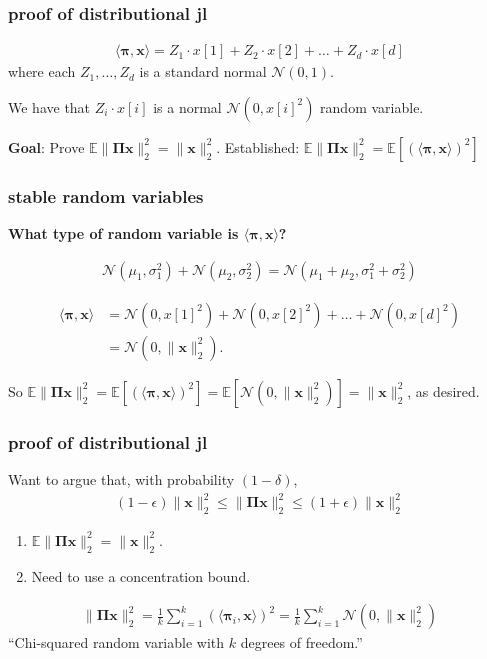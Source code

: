 \documentclass[compress]{beamer}
\newcommand{\bs}[1]{\boldsymbol{#1}}
\newcommand{\bv}[1]{\mathbf{#1}}
\newcommand{\E}{\mathbb{E}}
\begin{document}
\begin{frame}
	\frametitle{proof of distributional jl}	
	\begin{align*}
		\langle\bs{\pi},\bv{x}\rangle = Z_1\cdot{x}[1] + Z_2\cdot{x}[2]  +  \ldots + Z_d\cdot{x}[d]
	\end{align*}
	where each $Z_1, \ldots, Z_d$ is a standard normal $\mathcal{N}(0,1)$. 
	
	We have that $Z_i \cdot{x}[i]$ is a normal $\mathcal{N}(0,{x}[i]^2)$ random variable.
	
	\vspace{5em}
	\begin{block}{\vspace*{-3ex}}
		\small \textbf{Goal}: Prove $\E \|\bs{\Pi} \bv{x} \|_2^2 = \|\bv{x}\|_2^2$. Established: $\E \|\bs{\Pi} \bv{x} \|_2^2 = \E\left[\left(\langle\bs{\pi},\bv{x}\rangle\right)^2 \right]$
	\end{block}
\end{frame}

\begin{frame}[t]
	\frametitle{stable random variables}
	\textbf{What type of random variable is $\langle\bs{\pi},\bv{x}\rangle$?}
	\begin{fact}
		\begin{align*}
			\mathcal{N}(\mu_1, \sigma_1^2) + \mathcal{N}(\mu_2, \sigma_2^2) =  \mathcal{N}(\mu_1 + \mu_2, \sigma_1^2 + \sigma_2^2)
		\end{align*}
	\end{fact}
	\begin{align*}
		\langle\bs{\pi},\bv{x}\rangle &= \mathcal{N}(0,{x}[1]^2) + \mathcal{N}(0,{x}[2]^2) + \ldots + \mathcal{N}(0,{x}[d]^2) \\ &= \mathcal{N}(0,\|\bv{x}\|_2^2). 
	\end{align*}
	
	So $\E \|\bs{\Pi} \bv{x} \|_2^2 = \E\left[\left(\langle\bs{\pi},\bv{x}\rangle\right)^2 \right] = \E\left[\mathcal{N}(0,\|\bv{x}\|_2^2)\right]  = \|\bv{x}\|_2^2$, as desired.
\end{frame}

\begin{frame}
	\frametitle{proof of distributional jl}
	Want to argue that, with probability $(1-\delta)$,
	\begin{align*}
		(1-\epsilon)\|\bv{x}\|_2^2 \leq \|\bs{\Pi}\bv{x}\|_2^2 \leq (1+\epsilon)\|\bv{x}\|_2^2 
	\end{align*}
	
	\begin{enumerate}
		\item $\E \|\bs{\Pi} \bv{x} \|_2^2 = \|\bv{x}\|_2^2$.
		\item Need to use a concentration bound.
	\end{enumerate}
	\begin{align*}
		\|\bs{\Pi} \bv{x} \|_2^2 = \frac{1}{k}\sum_{i=1}^k \left(\langle\bs{\pi}_i,\bv{x}\rangle\right)^2 = \frac{1}{k}\sum_{i=1}^k \mathcal{N}(0,\|\bv{x}\|_2^2)
	\end{align*}
	\alert{``Chi-squared random variable with $k$ degrees of freedom.''}
\end{frame}
\end{document}
